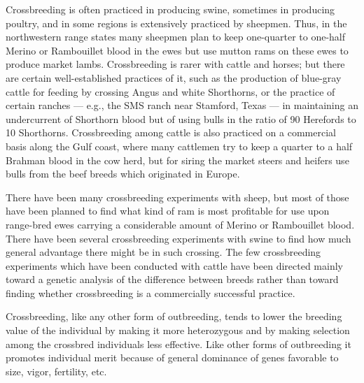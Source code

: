 Crossbreeding is often practiced in producing swine, sometimes in
producing poultry, and in some regions is extensively practiced by
sheepmen. Thus, in the northwestern range states many sheepmen plan
to keep one-quarter to one-half Merino or Rambouillet blood in the
ewes but use mutton rams on these ewes to produce market lambs.
Crossbreeding is rarer with cattle and horses; but there are certain
well-established practices of it, such as the production of blue-gray cattle for
feeding by crossing Angus and white Shorthorns, or the practice of certain
ranches --- e.g., the {SMS} ranch near Stamford, Texas --- in maintaining
an undercurrent of Shorthorn blood but of using bulls in the ratio
of 90 Herefords to 10 Shorthorns. Crossbreeding among cattle is also
practiced on a commercial basis along the Gulf coast, where many cattlemen
try to keep a quarter to a half Brahman blood in the cow herd,
but for siring the market steers and heifers use bulls from the beef
breeds which originated in Europe.

There have been many crossbreeding experiments with sheep, but
most of those have been planned to find what kind of ram is most profitable
for use upon range-bred ewes carrying a considerable amount of
Merino or Rambouillet blood. There have been several crossbreeding
experiments with swine to find how much general advantage there
might be in such crossing. The few crossbreeding experiments which
have been conducted with cattle have been directed mainly toward a
genetic analysis of the difference between breeds rather than toward
finding whether crossbreeding is a commercially successful practice.

Crossbreeding, like any other form of outbreeding, tends to lower
the breeding value of the individual by making it more heterozygous
and by making selection among the crossbred individuals less effective.
Like other forms of outbreeding it promotes individual merit because
of general dominance of genes favorable to size, vigor, fertility, etc.

